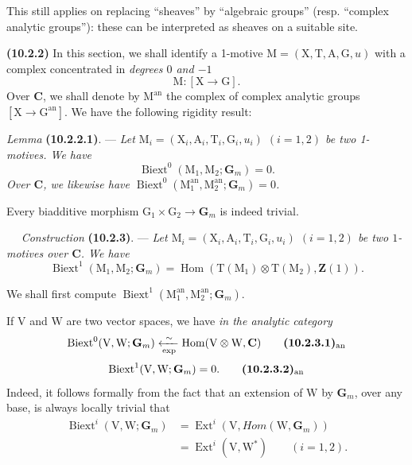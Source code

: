 \documentclass[11pt,leqno]{article}
\newcommand{\Page}[1]{\ifvmode\noindent\else\unskip\ \fi{\footnotesize\textcolor{gray}{[p.\,#1]}}\ \ignorespaces}
\begin{document}
This still applies on replacing “sheaves” by “algebraic
groups” (resp. “complex analytic groups”): these can
be interpreted as sheaves on a suitable site.

\textbf{(10.2.2)} In this section, we shall identify a 1-motive
\(\mathrm{M}=(\mathrm{X},\mathrm{T},\mathrm{A},\mathrm{G},u)\)
with a complex concentrated in \textit{degrees \(0\) and \(-1\)}
\[
\mathrm{M}:[\mathrm{X}\to\mathrm{G}].
\]
Over \(\mathbf{C}\), we shall denote by \(\mathrm{M}^{\mathrm{an}}\)
the complex of complex analytic groups
\([\mathrm{X}\to\mathrm{G}^{\mathrm{an}}]\).
We have the following rigidity result:

\textit{Lemma} \textbf{(10.2.2.1)}. —
\textit{Let
\(\mathrm{M}_i=(\mathrm{X}_i,\mathrm{A}_i,\mathrm{T}_i,\mathrm{G}_i,u_i)\)
\((i=1,2)\) be two 1-motives. We have}
\[
\operatorname{Biext}^0(\mathrm{M}_1,\mathrm{M}_2;\mathbf{G}_m)=0.
\]
\textit{Over \(\mathbf{C}\), we likewise have
\(\operatorname{Biext}^0
(\mathrm{M}_1^{\mathrm{an}},\mathrm{M}_2^{\mathrm{an}};\mathbf{G}_m)=0\).}

Every biadditive morphism
\(\mathrm{G}_1\times\mathrm{G}_2\to\mathbf{G}_m\)
is indeed trivial.

\Page{61}
\textit{Construction} \textbf{(10.2.3)}. — \textit{Let
\(\mathrm{M}_i=(\mathrm{X}_i,\mathrm{A}_i,\mathrm{T}_i,\mathrm{G}_i,u_i)\)
\((i=1,2)\) be two \(1\)-motives over \(\mathbf{C}\). We have}
\[
\operatorname{Biext}^{1}(\mathrm{M}_1,\mathrm{M}_2;\mathbf{G}_m)
=\operatorname{Hom}(\mathrm{T}(\mathrm{M}_1)\otimes
\mathrm{T}(\mathrm{M}_2),\mathbf{Z}(1)).
\]

We shall first compute
\(\operatorname{Biext}^{1}(\mathrm{M}_1^{\mathrm{an}},
\mathrm{M}_2^{\mathrm{an}};\mathbf{G}_m)\).

If \(\mathrm{V}\) and \(\mathrm{W}\) are two vector spaces, we have
\textit{in the analytic category}
\[
\operatorname{Biext}^{0}(\mathrm{V},\mathrm{W};\mathbf{G}_m)
\xleftarrow[\exp]{\sim}
\operatorname{Hom}(\mathrm{V}\otimes\mathrm{W},\mathbf{C})
\tag*{\textbf{(10.2.3.1)}\textsubscript{an}}
\]
\[
\operatorname{Biext}^{1}(\mathrm{V},\mathrm{W};\mathbf{G}_m)=0.
\tag*{\textbf{(10.2.3.2)}\textsubscript{an}}
\]
Indeed, it follows formally from the fact that an extension of
\(\mathrm{W}\) by \(\mathbf{G}_m\), over any base, is always
locally trivial that
\[
\begin{aligned}
\operatorname{Biext}^{i}(\mathrm{V},\mathrm{W};\mathbf{G}_m)
&=\operatorname{Ext}^{i}(\mathrm{V},
  \mathit{Hom}(\mathrm{W},\mathbf{G}_m))\\
&=\operatorname{Ext}^{i}(\mathrm{V},\mathrm{W}^{*})
\qquad(i=1,2).
\end{aligned}
\]
\end{document}
